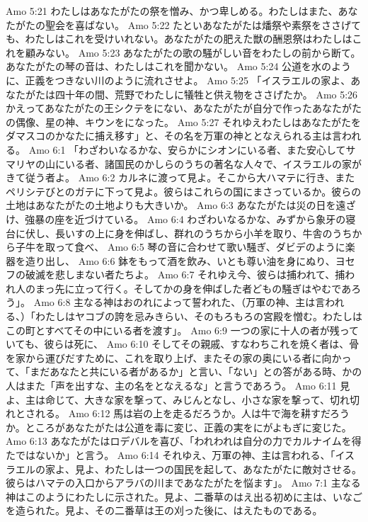 Amo 5:21  わたしはあなたがたの祭を憎み、かつ卑しめる。わたしはまた、あなたがたの聖会を喜ばない。
Amo 5:22  たといあなたがたは燔祭や素祭をささげても、わたしはこれを受けいれない。あなたがたの肥えた獣の酬恩祭はわたしはこれを顧みない。
Amo 5:23  あなたがたの歌の騒がしい音をわたしの前から断て。あなたがたの琴の音は、わたしはこれを聞かない。
Amo 5:24  公道を水のように、正義をつきない川のように流れさせよ。
Amo 5:25  「イスラエルの家よ、あなたがたは四十年の間、荒野でわたしに犠牲と供え物をささげたか。
Amo 5:26  かえってあなたがたの王シクテをにない、あなたがたが自分で作ったあなたがたの偶像、星の神、キウンをになった。
Amo 5:27  それゆえわたしはあなたがたをダマスコのかなたに捕え移す」と、その名を万軍の神ととなえられる主は言われる。
Amo 6:1  「わざわいなるかな、安らかにシオンにいる者、また安心してサマリヤの山にいる者、諸国民のかしらのうちの著名な人々で、イスラエルの家がきて従う者よ。
Amo 6:2  カルネに渡って見よ。そこから大ハマテに行き、またペリシテびとのガテに下って見よ。彼らはこれらの国にまさっているか。彼らの土地はあなたがたの土地よりも大きいか。
Amo 6:3  あなたがたは災の日を遠ざけ、強暴の座を近づけている。
Amo 6:4  わざわいなるかな、みずから象牙の寝台に伏し、長いすの上に身を伸ばし、群れのうちから小羊を取り、牛舎のうちから子牛を取って食べ、
Amo 6:5  琴の音に合わせて歌い騒ぎ、ダビデのように楽器を造り出し、
Amo 6:6  鉢をもって酒を飲み、いとも尊い油を身にぬり、ヨセフの破滅を悲しまない者たちよ。
Amo 6:7  それゆえ今、彼らは捕われて、捕われ人のまっ先に立って行く。そしてかの身を伸ばした者どもの騒ぎはやむであろう」。
Amo 6:8  主なる神はおのれによって誓われた、（万軍の神、主は言われる、）「わたしはヤコブの誇を忌みきらい、そのもろもろの宮殿を憎む。わたしはこの町とすべてその中にいる者を渡す」。
Amo 6:9  一つの家に十人の者が残っていても、彼らは死に、
Amo 6:10  そしてその親戚、すなわちこれを焼く者は、骨を家から運びだすために、これを取り上げ、またその家の奥にいる者に向かって、「まだあなたと共にいる者があるか」と言い、「ない」との答がある時、かの人はまた「声を出すな、主の名をとなえるな」と言うであろう。
Amo 6:11  見よ、主は命じて、大きな家を撃って、みじんとなし、小さな家を撃って、切れ切れとされる。
Amo 6:12  馬は岩の上を走るだろうか。人は牛で海を耕すだろうか。ところがあなたがたは公道を毒に変じ、正義の実をにがよもぎに変じた。
Amo 6:13  あなたがたはロデバルを喜び、「われわれは自分の力でカルナイムを得たではないか」と言う。
Amo 6:14  それゆえ、万軍の神、主は言われる、「イスラエルの家よ、見よ、わたしは一つの国民を起して、あなたがたに敵対させる。彼らはハマテの入口からアラバの川まであなたがたを悩ます」。
Amo 7:1  主なる神はこのようにわたしに示された。見よ、二番草のはえ出る初めに主は、いなごを造られた。見よ、その二番草は王の刈った後に、はえたものである。

